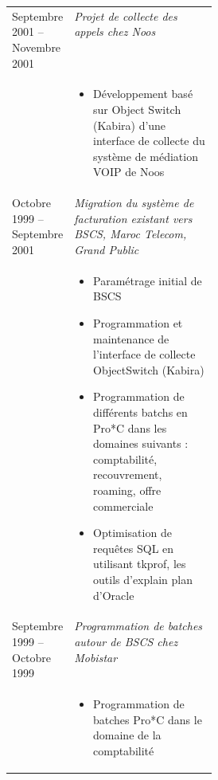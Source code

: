 \begin{longtable}{p{0.3\linewidth}X}
Septembre 2001 -- Novembre 2001 & \emph{Projet de collecte des appels chez Noos} \\
& \begin{itemize}
\item     D\'eveloppement bas\'e sur Object Switch (Kabira) d'une interface de collecte du syst\`eme de m\'ediation VOIP de Noos
\end{itemize} \\

Octobre 1999 -- Septembre 2001 & \emph{Migration du syst\`eme de facturation existant vers BSCS, Maroc Telecom, Grand Public} \\
& \begin{itemize}
\item     Param\'etrage initial de BSCS
\item     Programmation et maintenance de l'interface de collecte ObjectSwitch (Kabira)
\item     Programmation de diff\'erents batchs en Pro*C dans les domaines suivants : comptabilit\'e, recouvrement, roaming, offre commerciale
\item     Optimisation de requ\^etes SQL en utilisant tkprof, les outils d'explain plan d'Oracle
\end{itemize} \\

Septembre 1999 -- Octobre 1999 & \emph{Programmation de batches autour de BSCS chez Mobistar} \\
& \begin{itemize}
\item     Programmation de batches Pro*C dans le domaine de la comptabilit\'e
\end{itemize} \\

\end{longtable}
